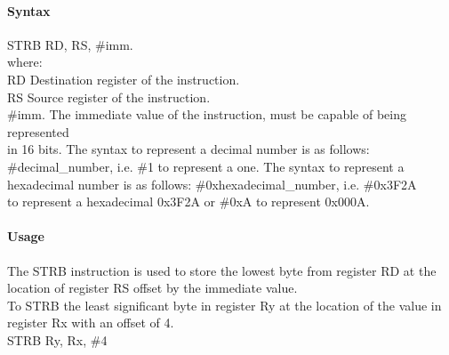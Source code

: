 \documentclass[12pt]{article}
\begin{document}
    \paragraph{Syntax}
    \begin{flushleft}
    STRB RD, RS, \#imm.\\
    \vspace{1em}        %
    where:\\
    \vspace{1em}
    RD  \hspace{3.6em} Destination register of the instruction.\\
    \vspace{1em}
    RS  \hspace{3.85em} Source register of the instruction.\\
    \vspace{1em}
    \#imm.  \hspace{1.8em} The immediate value of the instruction, must be capable of being represented\\             \hspace{5.4em} in 16 bits. The syntax to represent a decimal number is as follows:\\
            \hspace{5.4em} \#decimal\_number, i.e. \#1 to represent a one. The syntax to represent a\\
            \hspace{5.4em} hexadecimal number is as follows: \#0xhexadecimal\_number, i.e. \#0x3F2A \\
            \hspace{5.4em} to represent a hexadecimal 0x3F2A or \#0xA to represent 0x000A.\\
    \end{flushleft}
    
    \paragraph{Usage}
    \begin{flushleft}
    The STRB instruction is used to store the lowest byte from register RD at the location of register RS offset by the immediate value.\\    
    \vspace{1em}
    To STRB the least significant byte in register Ry at the location of the value in register Rx with an offset of 4.\\
    \vspace{1em}
    STRB Ry, Rx, \#4
    \end{flushleft}
    
\end{document}
